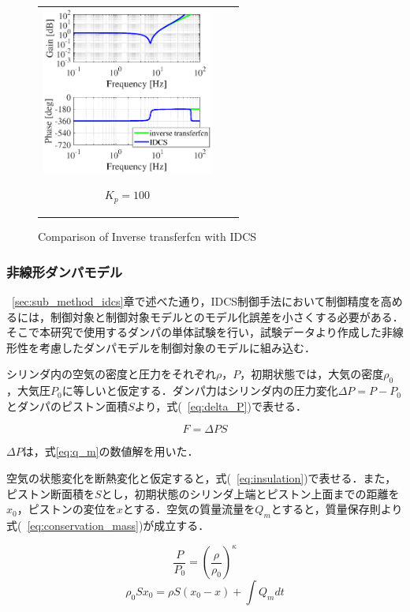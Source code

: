 \documentclass[a4paper,12pt]{article_vdlab_sotsuron}
\begin{document}
\begin{figure}[h]
\begin{tabular}{ccc}
\begin{minipage}{0.33\hsize}
  \begin{center}
    \includegraphics[height=55mm]{figure/bode_inverse_Kp100.eps}
    \end{center}
    \begin{center}
    \ $K_p=100$\
    \end{center}
  \end{minipage}
  \end{tabular}
  \vspace*{3mm}
  \caption{Comparison of Inverse transferfcn with IDCS}
    \label{fig:bode_inv_idcs}
\end{figure}

\newpage
\subsubsection{非線形ダンパモデル}
~\ref{sec:sub_method_idcs}章で述べた通り，IDCS制御手法において制御精度を高めるには，制御対象と制御対象モデルとのモデル化誤差を小さくする必要がある．そこで本研究で使用するダンパの単体試験を行い，試験データより作成した非線形性を考慮したダンパモデルを制御対象のモデルに組み込む．

シリンダ内の空気の密度と圧力をそれぞれ$\rho$，$P$，初期状態では，大気の密度$\rho_0$，大気圧$P_0$に等しいと仮定する．ダンパ力はシリンダ内の圧力変化$\Delta P = P-P_0$とダンパのピストン面積$S$より，式(~\ref{eq:delta_P})で表せる．

\begin{equation}
  F = \Delta PS \label{eq:delta_P}
\end{equation}

$\Delta P$は，式\ref{eq:q_m}の数値解を用いた．

空気の状態変化を断熱変化と仮定すると，式(~\ref{eq:insulation})で表せる．また，ピストン断面積を$S$とし，初期状態のシリンダ上端とピストン上面までの距離を$x_0$，ピストンの変位を$x$とする．空気の質量流量を$Q_m$とすると，質量保存則より式(~\ref{eq:conservation_mass})が成立する．

\begin{equation}
  \frac{P}{P_0} = \left(\frac{\rho}{\rho_0} \right)^\kappa \label{eq:insulation}
\end{equation}
\begin{equation}
  \rho_0 S x_0 = \rho S(x_0 - x) + \int Q_m dt \label{eq:conservation_mass}
\end{equation}
\end{document}
